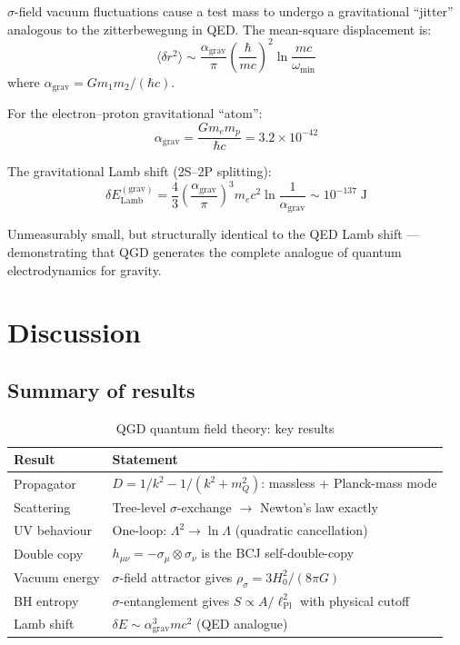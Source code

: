 \documentclass[11pt,a4paper]{article}
\theoremstyle{plain}
\theoremstyle{definition}
\theoremstyle{remark}
\newcommand{\mQ}{m_Q}
\newcommand{\lPl}{\ell_{\mathrm{Pl}}}
\begin{document}
$\sigma$-field vacuum fluctuations cause a test mass to undergo a gravitational ``jitter'' analogous to the zitterbewegung in QED.  The mean-square displacement is:
\begin{equation}
  \langle\delta r^2\rangle \sim \frac{\alpha_{\mathrm{grav}}}{\pi}\left(\frac{\hbar}{mc}\right)^2\ln\frac{mc}{\omega_{\min}}
\end{equation}
where $\alpha_{\mathrm{grav}} = Gm_1m_2/(\hbar c)$.

For the electron--proton gravitational ``atom'':
\begin{equation}
  \alpha_{\mathrm{grav}} = \frac{Gm_em_p}{\hbar c} = 3.2\times10^{-42}
\end{equation}

The gravitational Lamb shift (2S--2P splitting):
\begin{equation}
  \delta E_{\mathrm{Lamb}}^{(\mathrm{grav})} = \frac{4}{3}\left(\frac{\alpha_{\mathrm{grav}}}{\pi}\right)^3 m_ec^2\ln\frac{1}{\alpha_{\mathrm{grav}}} \sim 10^{-137}\;\mathrm{J}
\end{equation}

Unmeasurably small, but structurally identical to the QED Lamb shift --- demonstrating that QGD generates the complete analogue of quantum electrodynamics for gravity.

\section{Discussion}
\label{sec:discussion}

\subsection{Summary of results}

\begin{table}[h]
  \centering
  \renewcommand{\arraystretch}{1.4}
  \caption{QGD quantum field theory: key results}
  \begin{tabular}{@{}lp{9cm}@{}}
    \toprule
    Result & Statement \\
    \midrule
    Propagator & $D = 1/k^2 - 1/(k^2+\mQ^2)$: massless + Planck-mass mode \\
    Scattering & Tree-level $\sigma$-exchange $\to$ Newton's law exactly \\
    UV behaviour & One-loop: $\Lambda^2 \to \ln\Lambda$ (quadratic cancellation) \\
    Double copy & $h_{\mu\nu} = -\sigma_\mu\otimes\sigma_\nu$ is the BCJ self-double-copy \\
    Vacuum energy & $\sigma$-field attractor gives $\rho_\sigma = 3H_0^2/(8\pi G)$ \\
    BH entropy & $\sigma$-entanglement gives $S \propto A/\lPl^2$ with physical cutoff \\
    Lamb shift & $\delta E \sim \alpha_{\mathrm{grav}}^3 mc^2$ (QED analogue) \\
    \bottomrule
  \end{tabular}
\end{table}
\end{document}
